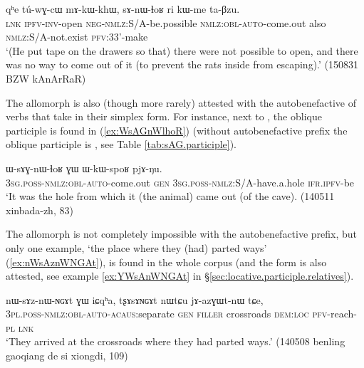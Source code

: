 \begin{exe}
\ex \label{ex:sAnWlhoR.kWme}
\gll  qʰe tú-wɣ-cɯ mɤ-kɯ-khɯ, sɤ-nɯ-ɬoʁ ri kɯ-me ta-βzu. \\
\textsc{lnk} \textsc{ipfv}-\textsc{inv}-open \textsc{neg}-\textsc{nmlz}:S/A-be.possible \textsc{nmlz}:\textsc{obl}-\textsc{auto}-come.out also \textsc{nmlz}:S/A-not.exist \textsc{pfv}:3\fl{}3'-make \\
\glt `(He put tape on the drawers so that) there were not possible to open, and there was no way to come out of it (to prevent the rats inside from escaping).' (150831 BZW kAnArRaR)
\end{exe}

The allomorph  is also (though more rarely) attested with the  autobenefactive of verbs that take  in their simplex form. For instance, next to , the oblique participle  is found in (\ref{ex:WsAGnWlhoR}) (without autobenefactive prefix the oblique participle is , see Table \ref{tab:sAG.participle}).

\begin{exe}
\ex \label{ex:WsAGnWlhoR}
\gll ɯ-sɤɣ-nɯ-ɬoʁ ɣɯ ɯ-kɯ-spoʁ pjɤ-ŋu.  \\
\textsc{3sg}.\textsc{poss}-\textsc{nmlz}:\textsc{obl}-\textsc{auto}-come.out \textsc{gen} \textsc{3sg}.\textsc{poss}-\textsc{nmlz}:S/A-have.a.hole \textsc{ifr}.\textsc{ipfv}-be \\
\glt `It was the hole from which it (the animal) came out (of the cave).  (140511 xinbada-zh, 83)
\end{exe} 

The  allomorph is not completely impossible with the autobenefactive  prefix, but only one example,  `the place where they (had) parted ways' (\ref{ex:nWsAznWNGAt}), is found in the whole corpus (and the form  is also attested, see example \ref{ex:YWsAnWNGAt} in §\ref{sec:locative.participle.relatives}).

\begin{exe}
\ex \label{ex:nWsAznWNGAt}
\gll  nɯ-sɤz-nɯ-ɴɢɤt ɣɯ iɕqʰa, tʂɤsɤɴɢɤt nɯtɕu jɤ-azɣɯt-nɯ tɕe, \\
\textsc{3pl}.\textsc{poss}-\textsc{nmlz}:\textsc{obl}-\textsc{auto}-\textsc{acaus}:separate \textsc{gen} \textsc{filler}  crossroads \textsc{dem}:\textsc{loc} \textsc{pfv}-reach-\textsc{pl} \textsc{lnk} \\
\glt `They arrived at the crossroads where they had parted ways.' (140508 benling gaoqiang de si xiongdi, 109)
\end{exe} 

